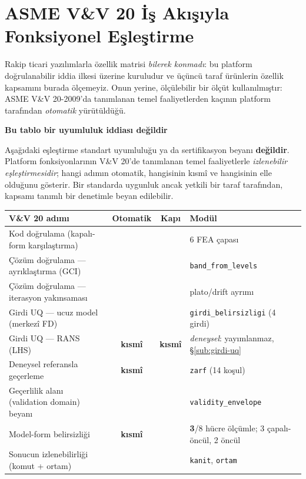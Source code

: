 \documentclass[11pt,a4paper]{article}
\newcommand{\ev}{\textcolor{iyi}{\textbf{\checkmark}}}
\newcommand{\ks}{\textcolor{orta}{\textbf{kısmî}}}
\newcommand{\kkkenar}{lacivert}
\newcommand{\kkzemin}{kod}
\newenvironment{renkkutu}[3]{%
  \renewcommand{\kkkenar}{#1}\renewcommand{\kkzemin}{#2}%
  \par\medskip\noindent
  \begin{lrbox}{\kutugovde}%
  \begin{minipage}{\dimexpr\linewidth-2\fboxsep-2\fboxrule\relax}\footnotesize
  \textcolor{#1}{\textbf{#3}}\par\vspace{3pt}%
}{%
  \end{minipage}%
  \end{lrbox}%
  \noindent\fcolorbox{\kkkenar}{\kkzemin}{\usebox{\kutugovde}}%
  \par\medskip
}
\newenvironment{dikkat}[1]{\begin{renkkutu}{orta}{ortabg}{#1}}{\end{renkkutu}}
\begin{document}
\section{ASME V\&V 20 İş Akışıyla Fonksiyonel Eşleştirme}
\label{sec:vv20}

Rakip ticari yazılımlarla özellik matrisi \emph{bilerek konmadı}: bu platform
doğrulanabilir iddia ilkesi üzerine kuruludur ve üçüncü taraf ürünlerin özellik
kapsamını burada ölçemeyiz. Onun yerine, ölçülebilir bir ölçüt kullanılmıştır:
ASME V\&V 20-2009'da tanımlanan temel faaliyetlerden kaçının platform
tarafından \emph{otomatik} yürütüldüğü.

\begin{dikkat}{Bu tablo bir uyumluluk iddiası değildir}
Aşağıdaki eşleştirme standart uyumluluğu ya da sertifikasyon beyanı
\textbf{değildir}. Platform fonksiyonlarının V\&V 20'de tanımlanan temel
faaliyetlerle \emph{izlenebilir eşleştirmesidir}; hangi adımın otomatik,
hangisinin kısmî ve hangisinin elle olduğunu gösterir. Bir standarda uygunluk
ancak yetkili bir taraf tarafından, kapsamı tanımlı bir denetimle beyan
edilebilir.
\end{dikkat}

\begin{center}\footnotesize
\begin{tabular}{@{}p{72mm}ccp{38mm}@{}}
\toprule
\textbf{V\&V 20 adımı} & \textbf{Otomatik} & \textbf{Kapı} & \textbf{Modül} \\
\midrule
Kod doğrulama (kapalı-form karşılaştırma) & \ev & \ev & 6 FEA çapası \\
Çözüm doğrulama --- ayrıklaştırma (GCI) & \ev & \ev & \texttt{band\_from\_levels} \\
Çözüm doğrulama --- iterasyon yakınsaması & \ev & \ev & plato/drift ayrımı \\
Girdi UQ --- ucuz model (merkezî FD) & \ev & \ev & \texttt{girdi\_belirsizligi} (4 girdi) \\
Girdi UQ --- RANS (LHS) & \ks & \ks & \emph{deneysel}: yayımlanmaz, \S\ref{sub:girdi-uq} \\
Deneysel referansla geçerleme & \ks & \ev & \texttt{zarf} (14 koşul) \\
Geçerlilik alanı (validation domain) beyanı & \ev & \ev & \texttt{validity\_envelope} \\
Model-form belirsizliği & \ks & \ev & \textbf{3}/8 hücre ölçümle; 3 çapalı-öncül, 2 öncül \\
Sonucun izlenebilirliği (komut + ortam) & \ev & \ev & \texttt{kanit}, \texttt{ortam} \\
\bottomrule
\end{tabular}
\end{center}
\end{document}

